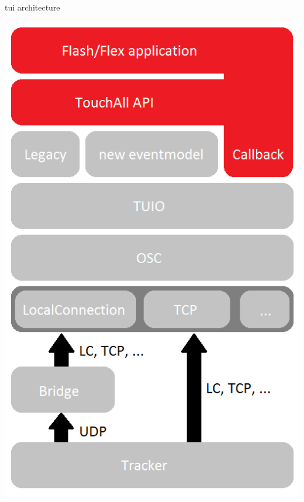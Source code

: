 \begin{frame}
\begin{block}{tui architecture}
\begin{minipage}{1.0\linewidth}
\begin{center}
\begin{minipage}{.49\linewidth}
\includegraphics[scale=0.33]{images/as3LibDiagram.png} 
\end{minipage}
\end{center}
\end{minipage}
\end{block}
\end{frame}


